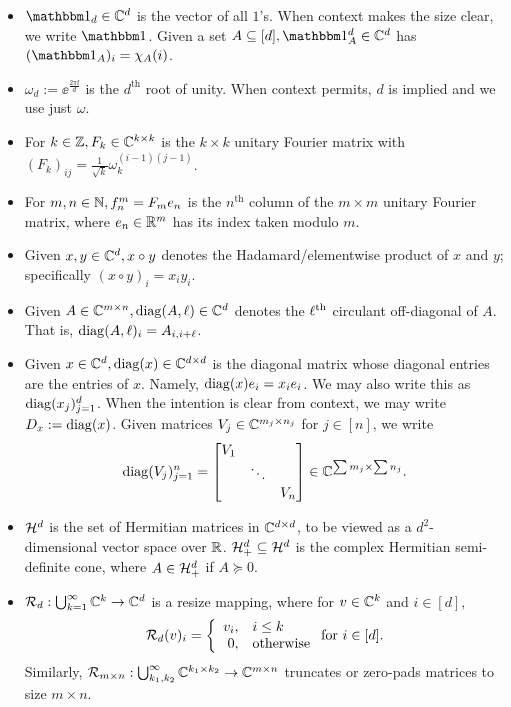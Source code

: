 \begin{itemize}
  \item $\one_d \in \C^d$ is the vector of all $1$'s.  When context makes the size clear, we write $\one$.  Given a set $A \subset [d], \one_A^d \in \C^d$ has $(\one_A)_i = \chi_A(i)$.
\item $\omega_d := \ee^{\frac{2 \pi \ii}{d}}$ is the $d^{\text{th}}$ root of unity.  When context permits, $d$ is implied and we use just $\omega$.
\item For $k \in \mathbb{Z}, F_k \in \mathbb{C}^{k \times k}$ is the $k \times k$ unitary Fourier matrix with $(F_k)_{ij} = \frac{1}{\sqrt{k}} \omega_k^{(i-1)(j-1)}$.
  \item For $m, n \in \mathbb{N}, f_n^m = F_m e_n$ is the $n^{\text{th}}$ column of the $m \times m$ unitary Fourier matrix, where $e_n \in \mathbb{R}^m$ has its index taken modulo $m$.
\item Given $x, y \in \mathbb{C}^d, x \circ y$ denotes the Hadamard/elementwise product of $x$ and $y$; specifically $(x \circ y)_i = x_i y_i$.
\item Given $A \in \mathbb{C}^{m \times n}, \operatorname{diag}(A, \ell) \in \mathbb{C}^d$ denotes the $\ell^{\text{th}}$ circulant off-diagonal of $A$.  That is, $\operatorname{diag}(A, \ell)_i = A_{i, i + \ell}$.
\item Given $x \in \mathbb{C}^d, \operatorname{diag}(x) \in \mathbb{C}^{d \times d}$ is the diagonal matrix whose diagonal entries are the entries of $x$.  Namely, $\operatorname{diag}(x) e_i = x_i e_i$.  We may also write this as $\operatorname{diag}(x_j)_{j = 1}^d$.  When the intention is clear from context, we may write $D_x := \operatorname{diag}(x)$.  Given matrices $V_j \in \mathbb{C}^{m_j \times n_j}$ for $j \in [n]$, we write \[\operatorname{diag}(V_j)_{j = 1}^n = \begin{bmatrix} V_1 & & \\ & \ddots & \\ & & V_n \end{bmatrix} \in \mathbb{C}^{\sum m_j \times \sum n_j}.\]
  \item $\mathcal{H}^d$ is the set of Hermitian matrices in $\mathbb{C}^{d \times d}$, to be viewed as a $d^2$-dimensional vector space over $\mathbb{R}$.  $\mathcal{H}^d_+ \subseteq \mathcal{H}^d$ is the complex Hermitian semi-definite cone, where $A \in \mathcal{H}^d_+$ if $A \succeq 0$.
  \item $\mathcal{R}_d : \bigcup_{k = 1}^\infty \mathbb{C}^k \to \mathbb{C}^d$ is a resize mapping, where for $v \in \mathbb{C}^k$ and $i \in [d],$ $$\mathcal{R}_d(v)_i = \left\{\begin{array}{r@{,\quad}l} v_i & i \le k \\ 0 & \text{otherwise} \end{array}\right. \text{for}\ i \in [d].$$  Similarly, $\mathcal{R}_{m \times n} : \bigcup_{k_1, k_2}^\infty \mathbb{C}^{k_1 \times k_2} \to \mathbb{C}^{m \times n}$ truncates or zero-pads matrices to size $m \times n.$

\end{itemize}
